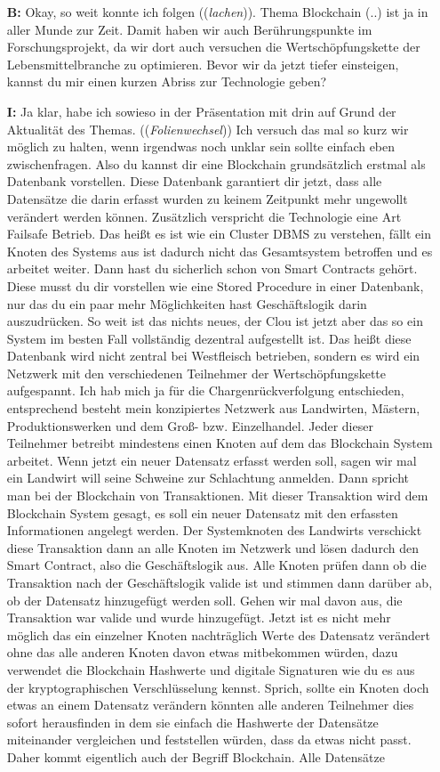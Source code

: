 \begin{itemize}
  \item[\textbf{B:}] Okay, so weit konnte ich folgen ((\textit{lachen})). Thema Blockchain (..) ist ja in aller Munde zur Zeit. Damit haben wir auch Berührungspunkte im Forschungsprojekt, da wir dort auch versuchen die Wertschöpfungskette der Lebensmittelbranche zu optimieren. Bevor wir da jetzt tiefer einsteigen, kannst du mir einen kurzen Abriss zur Technologie geben?
  \item[\textbf{I:}] Ja klar, habe ich sowieso in der Präsentation mit drin auf Grund der Aktualität des Themas. ((\textit{Folienwechsel})) Ich versuch das mal so kurz wir möglich zu halten, wenn irgendwas noch unklar sein sollte einfach eben zwischenfragen. Also du kannst dir eine Blockchain grundsätzlich erstmal als Datenbank vorstellen. Diese Datenbank garantiert dir jetzt, dass alle Datensätze die darin erfasst wurden zu keinem Zeitpunkt mehr ungewollt verändert werden können. Zusätzlich verspricht die Technologie eine Art Failsafe Betrieb. Das heißt es ist wie ein Cluster DBMS zu verstehen, fällt ein Knoten des Systems aus ist dadurch nicht das Gesamtsystem betroffen und es arbeitet weiter. Dann hast du sicherlich schon von Smart Contracts gehört. Diese musst du dir vorstellen wie eine \glqq Stored Procedure\grqq{} in einer Datenbank, nur das du ein paar mehr Möglichkeiten hast Geschäftslogik darin auszudrücken. So weit ist das nichts neues, der Clou ist jetzt aber das so ein System im besten Fall vollständig dezentral aufgestellt ist. Das heißt diese \glqq Datenbank\grqq{} wird nicht zentral bei Westfleisch betrieben, sondern es wird ein Netzwerk mit den verschiedenen Teilnehmer der Wertschöpfungskette aufgespannt. Ich hab mich ja für die Chargenrückverfolgung entschieden, entsprechend besteht mein konzipiertes Netzwerk aus Landwirten, Mästern, Produktionswerken und dem Groß- bzw. Einzelhandel. Jeder dieser Teilnehmer betreibt mindestens einen Knoten auf dem das Blockchain System arbeitet. Wenn jetzt ein neuer Datensatz erfasst werden soll, sagen wir mal ein Landwirt will seine Schweine zur Schlachtung anmelden. Dann spricht man bei der Blockchain von Transaktionen. Mit dieser Transaktion wird dem Blockchain System gesagt, es soll ein neuer Datensatz mit den erfassten Informationen angelegt werden. Der Systemknoten des Landwirts verschickt diese Transaktion dann an alle Knoten im Netzwerk und lösen dadurch den Smart Contract, also die Geschäftslogik aus. Alle Knoten prüfen dann ob die Transaktion nach der Geschäftslogik valide ist und stimmen dann darüber ab, ob der Datensatz hinzugefügt werden soll. Gehen wir mal davon aus, die Transaktion war valide und wurde hinzugefügt. Jetzt ist es nicht mehr möglich das ein einzelner Knoten nachträglich Werte des Datensatz verändert ohne das alle anderen Knoten davon etwas mitbekommen würden, dazu verwendet die Blockchain Hashwerte und digitale Signaturen wie du es aus der kryptographischen Verschlüsselung kennst. Sprich, sollte ein Knoten doch etwas an einem Datensatz verändern könnten alle anderen Teilnehmer dies sofort herausfinden in dem sie einfach die Hashwerte der Datensätze miteinander vergleichen und feststellen würden, dass da etwas nicht passt. Daher kommt eigentlich auch der Begriff Blockchain. Alle Datensätze 
\end{itemize}
